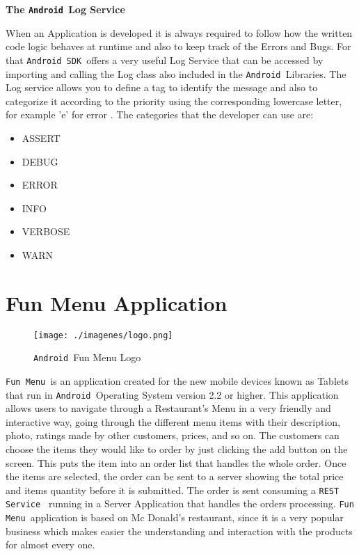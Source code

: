\documentclass[journal]{IEEEtran}
\newcommand{\andrs}{\texttt{Android~}}
\newcommand{\asdk}{\texttt{Android SDK~}}
\newcommand{\restss}{\texttt{REST Service~}}
\newcommand{\funs}{\texttt{Fun Menu~}}
\begin{document}
\textbf{The \andrs Log Service}

When an Application is developed it is always required to follow how the written code logic  behaves at runtime and also to keep
track of the Errors and Bugs. For that \asdk offers a very useful Log Service that can be accessed by importing and calling the Log 
class also included in the \andrs Libraries. The Log service allows you to define a tag to identify the message and also to 
categorize it according to the priority using the corresponding lowercase letter, for example 'e' for error \cite{log}. 
The categories that the developer can use are:\\

\begin{itemize}
  \item ASSERT
  \item DEBUG
  \item ERROR
  \item INFO
  \item VERBOSE
  \item WARN
\end{itemize}

\section{Fun Menu Application}
 \begin{figure}[hb]
 \centering
 \texttt{[image: ./imagenes/logo.png]}
 \caption{\andrs Fun Menu Logo}
\end{figure}

\funs is an application created for the new mobile devices known as Tablets that run in \andrs Operating System version 2.2 
or higher. This application allows users to navigate through a Restaurant's Menu in a very friendly and interactive way, going 
through the different menu items with their description, photo, ratings made by other customers, prices, and so on. The customers 
can choose the items they would like to order by just clicking the add button on the screen. This puts the item into an order list 
that handles the whole order. Once the items are selected, the order can be sent to a server showing the total price and items 
quantity before it is submitted. The order is sent consuming a \restss\cite{rest} running in a Server Application that handles 
the orders processing. \funs application is based on Mc Donald's restaurant, since it is a very popular business which makes 
easier the understanding and interaction with the products for almost every one.\\
\end{document}

